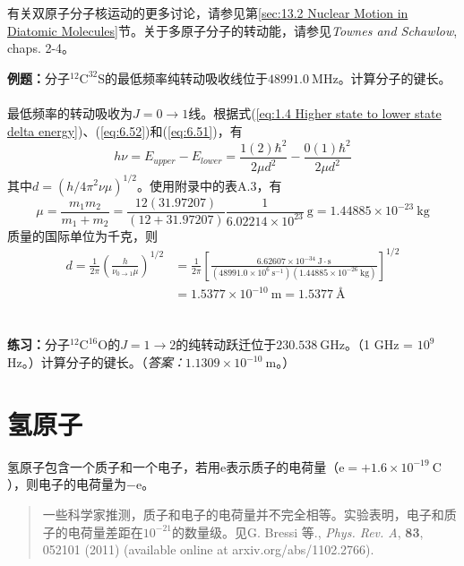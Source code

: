     有关双原子分子核运动的更多讨论，请参见第\ref{sec:13.2 Nuclear Motion in Diatomic Molecules}节。关于多原子分子的转动能，请参见\textit{Townes and Schawlow}, chaps. 2-4。

    \begin{examplebox}
        \textbf{例题：}分子$^{12}\mathrm{C}^{32}\mathrm{S}$的最低频率纯转动吸收线位于$48991.0 \: \mathrm{MHz}$。计算分子的键长。
        \\
        \\
        最低频率的转动吸收为$J = 0 \to 1$线。根据式(\ref{eq:1.4 Higher state to lower state delta energy})、(\ref{eq:6.52})和(\ref{eq:6.51})，有
        \begin{equation*}
            h\nu = E_{upper} - E_{lower} = \frac{1\left(2\right)\hbar^2}{2\mu d^2} - \frac{0\left(1\right)\hbar^2}{2\mu d^2}
        \end{equation*}
        其中$d = \left(h/4\pi^2\nu\mu\right)^{1/2}$。使用附录中的表A.3，有
        \begin{equation*}
            \mu = \frac{m_1m_2}{m_1 + m_2} = \frac{12\left(31.97207\right)}{\left(12+31.97207\right)}\frac{1}{6.02214\times 10^{23}} \: \mathrm{g} = 1.44885 \times 10^{-23} \: \mathrm{kg}
        \end{equation*}
        质量的国际单位为千克，则
        \begin{equation*}
            \begin{aligned}
                d = \frac{1}{2\pi}\left(\frac{h}{\nu_{0 \to 1}\mu}\right)^{1/2} & = \frac{1}{2\pi}\left[\frac{6.62607 \times 10^{-34} \: \mathrm{J \cdot s}}{\left(48991.0 \times 10^6\: \mathrm{s}^{-1}\right) \left(1.44885 \times 10^{-26} \: \mathrm{kg}\right)}\right]^{1/2} \\
                & = 1.5377 \times 10^{-10} \: \mathrm{m} = 1.5377 \: \mathrm{Å}
            \end{aligned}
        \end{equation*}
        \\
        \\
        \textbf{练习：}分子$^{12}\mathrm{C}^{16}\mathrm{O}$的$J = 1 \to 2$的纯转动跃迁位于$230.538 \: \mathrm{GHz}$。（1 GHz = $10^9$ Hz。）计算分子的键长。（\textit{答案：}$1.1309 \times 10^{-10} \: \mathrm{m}$。）
    \end{examplebox}

\section{氢原子}
\label{sec:6.5 The Hydrogen Atom}
    氢原子包含一个质子和一个电子，若用$\mathrm{e}$表示质子的电荷量（$\mathrm{e} = + 1.6 \times 10^{-19} \: \mathrm{C}$），则电子的电荷量为$-\mathrm{e}$。
    \begin{quote}
        \small
        一些科学家推测，质子和电子的电荷量并不完全相等。实验表明，电子和质子的电荷量差距在$10^{-21}$的数量级。见G. Bressi 等., \textit{Phys. Rev. A}, \textbf{83}, 052101 (2011) (available online at arxiv.org/abs/1102.2766).
    \end{quote}


